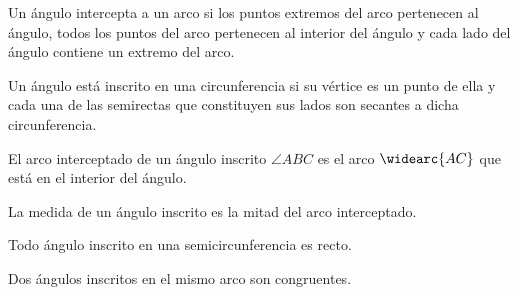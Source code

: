 \begin{definition}
    Un ángulo intercepta a un arco si los puntos extremos del arco pertenecen al ángulo, todos los puntos del arco pertenecen al interior del ángulo y cada lado del ángulo contiene un extremo del arco.
\end{definition}

\begin{definition}
    Un ángulo está inscrito en una circunferencia si su vértice es un punto de ella y cada una de las semirectas que constituyen sus lados son secantes a dicha circunferencia.
\end{definition}

\begin{definition}
    El arco interceptado de un ángulo inscrito $\angle{ABC}$ es el arco $\widearc{AC}$ que está en el interior del ángulo.
\end{definition}

\begin{theorem}
    La medida de un ángulo inscrito es la mitad del arco interceptado.

    \begin{figure}[!h]
        \centering
        
        \label{fig:medida-ang-inscrito}
    \end{figure}
    
\end{theorem}

\begin{theorem}
    Todo ángulo inscrito en una semicircunferencia es recto.

    \begin{figure}[!h]
        \centering
        
        \label{fig:ang-inscrito-semicirc-recto}
    \end{figure}
    
\end{theorem}

\clearpage

\begin{theorem}
    Dos ángulos inscritos en el mismo arco son congruentes.

    \begin{figure}[!h]
        \centering
        
        \label{fig:inscritos-congruentes}
    \end{figure}
    
\end{theorem}

